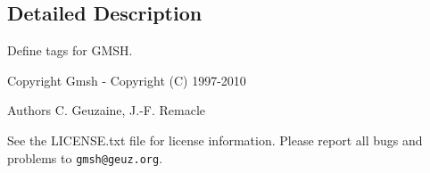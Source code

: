 \subsection{Detailed Description}
Define tags for G\-M\-S\-H. \begin{DoxyCopyright}{Copyright}
Gmsh -\/ Copyright (C) 1997-\/2010 
\end{DoxyCopyright}
\begin{DoxyAuthor}{Authors}
C. Geuzaine, J.-\/\-F. Remacle
\end{DoxyAuthor}
See the L\-I\-C\-E\-N\-S\-E.\-txt file for license information. Please report all bugs and problems to {\tt gmsh@geuz.\-org}. 